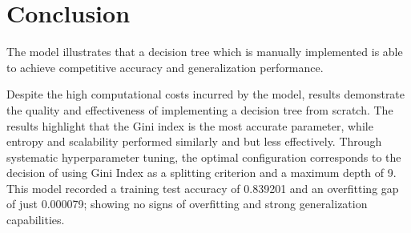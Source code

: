 \documentclass{article}
\begin{document}
\section{Conclusion}

The model illustrates that a decision tree which is manually implemented is able to achieve competitive accuracy and generalization performance.

Despite the high computational costs incurred by the model, results demonstrate the quality and effectiveness of implementing a decision tree from scratch. The results highlight that the Gini index is the most accurate parameter, while entropy and scalability performed similarly and but less effectively.
Through systematic hyperparameter tuning, the optimal configuration corresponds to the decision of using Gini Index as a splitting criterion and a maximum depth of 9. This model recorded a training test accuracy of 0.839201 and an overfitting gap of just 0.000079; showing no signs of overfitting and strong generalization capabilities.











\end{document}

